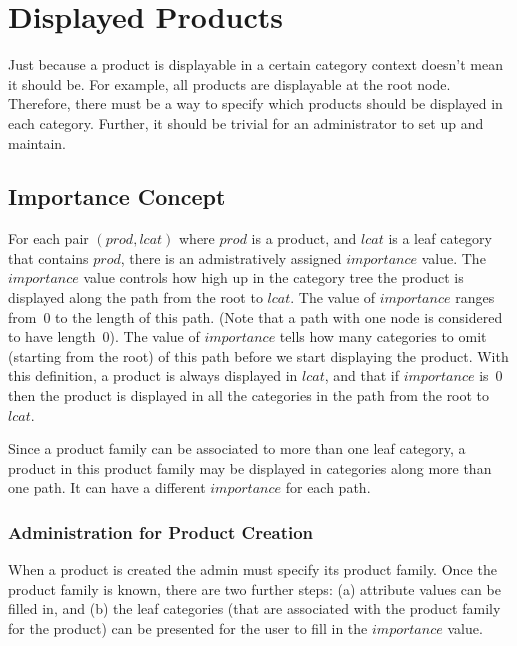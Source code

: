 \documentclass[letterpaper, 12pt]{article}
\begin{document}
\section{Displayed Products}
Just because a product is displayable in a certain category context doesn't mean it should be.  For example, all products are displayable at the root node.  Therefore, there must be a way to specify which products should be displayed in each category.  Further, it should be trivial for an administrator to set up and maintain.
\subsection{Importance Concept}
\par
For each pair $(prod, lcat)$ where $prod$ is a product, and $lcat$ is a leaf category that contains $prod$, there is an admistratively assigned $importance$ value. The $importance$ value controls how high up in the category tree the product is displayed along the path from the root to $lcat$. The value of $importance$ ranges from~$0$ to the length of this path.  (Note that a path with one node is considered to have length~$0$).  The value of $importance$ tells how many categories to omit (starting from the root) of this path before we start displaying the product. With this definition, a product is always displayed in $lcat$, and that if $importance$ is~$0$ then the product is displayed in all the categories in the path from the root to $lcat$.
\par
Since a product family can be associated to more than one leaf category, a product in this product family may be displayed in categories along more than one path.  It can have a different $importance$ for each path.
\par
\subsubsection{Administration for Product Creation}
When a product is created the admin must specify its product family. Once the product family is known, there are two further steps:  (a) attribute values can be filled in, and (b) the leaf categories (that are associated with the product family for the product) can be presented for the user to fill in the $importance$ value.
\end{document}
